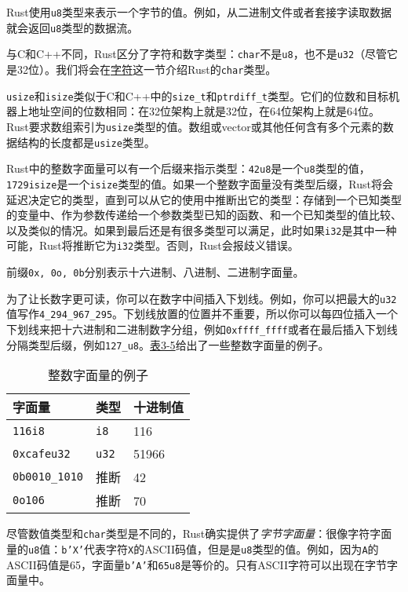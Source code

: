 Rust使用\texttt{u8}类型来表示一个字节的值。例如，从二进制文件或者套接字读取数据就会返回\texttt{u8}类型的数据流。

与C和C++不同，Rust区分了字符和数字类型：\texttt{char}不是\texttt{u8}，也不是\texttt{u32}（尽管它是32位）。我们将会在\hyperref[char]{字符}这一节介绍Rust的\texttt{char}类型。

\texttt{usize}和\texttt{isize}类似于C和C++中的\texttt{size\_t}和\texttt{ptrdiff\_t}类型。它们的位数和目标机器上地址空间的位数相同：在32位架构上就是32位，在64位架构上就是64位。Rust要求数组索引为\texttt{usize}类型的值。数组或vector或其他任何含有多个元素的数据结构的长度都是\texttt{usize}类型。

Rust中的整数字面量可以有一个后缀来指示类型：\texttt{42u8}是一个\texttt{u8}类型的值，\texttt{1729isize}是一个\texttt{isize}类型的值。如果一个整数字面量没有类型后缀，Rust将会延迟决定它的类型，直到可以从它的使用中推断出它的类型：存储到一个已知类型的变量中、作为参数传递给一个参数类型已知的函数、和一个已知类型的值比较、以及类似的情况。如果到最后还是有很多类型可以满足，此时如果\texttt{i32}是其中一种可能，Rust将推断它为\texttt{i32}类型。否则，Rust会报歧义错误。

前缀\texttt{0x, 0o, 0b}分别表示十六进制、八进制、二进制字面量。

为了让长数字更可读，你可以在数字中间插入下划线。例如，你可以把最大的\texttt{u32}值写作\texttt{4\_294\_967\_295}。下划线放置的位置并不重要，所以你可以每四位插入一个下划线来把十六进制和二进制数字分组，例如\texttt{0xffff\_ffff}或者在最后插入下划线分隔类型后缀，例如\texttt{127\_u8}。\hyperref[t3-5]{表3-5}给出了一些整数字面量的例子。
\begin{table}[htbp]
    \centering
    \caption{整数字面量的例子}
    \label{t3-5}
    \begin{tabular}{lll}
        \hline
        \textbf{字面量} & \textbf{类型} & \textbf{十进制值} \\
        \hline
        \texttt{116i8}          & \texttt{i8}       &   116 \\
        \rowcolor{tablecolor}
        \texttt{0xcafeu32}      & \texttt{u32}      &   51966 \\
        \texttt{0b0010\_1010}   & 推断              &   42 \\
        \rowcolor{tablecolor}
        \texttt{0o106}          & 推断              &   70 \\
    \end{tabular}
\end{table}

尽管数值类型和\texttt{char}类型是不同的，Rust确实提供了\emph{字节字面量}：很像字符字面量的\texttt{u8}值：\texttt{b'X'}代表字符\texttt{X}的ASCII码值，但是是\texttt{u8}类型的值。例如，因为\texttt{A}的ASCII码值是65，字面量\texttt{b'A'}和\texttt{65u8}是等价的。只有ASCII字符可以出现在字节字面量中。

